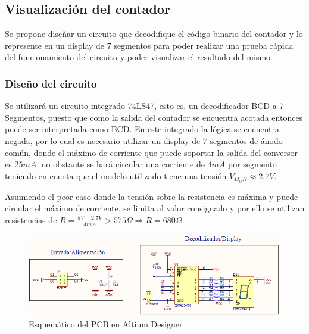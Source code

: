 \subsection{Visualizaci\'on del contador}
Se propone dise\~nar un circuito que decodifique el c\'odigo binario del contador y lo represente en un display
de 7 segmentos para poder realizar una prueba r\'apida del funcionamiento del circuito y poder visualizar el resultado del mismo.

\subsubsection{Dise\~no del circuito}
Se utilizar\'a un circuito integrado 74LS47, esto es, un decodificador BCD a 7 Segmentos, puesto que como la salida del contador se encuentra acotada
entonces puede ser interpretada como BCD. En este integrado la l\'ogica se encuentra negada, por lo cual es necesario utilizar un display de 7 segmentos de \'anodo com\'un,
donde el m\'aximo de corriente que puede soportar la salida del conversor es $25mA$, no obstante se har\'a circular una corriente de $4mA$ por segmento teniendo en cuenta que el modelo utilizado tiene una
tensi\'on $V_{D_ON} \approx 2.7V$.

Asumiendo el peor caso donde la tensi\'on sobre la resistencia es m\'axima y puede circular el m\'aximo de corriente, se limita al valor consignado y por ello se utilizan resistencias
de $R = \frac{5V - 2.7V}{4mA} > 575 \Omega \Rightarrow R = 680 \Omega$.

\begin{figure}[H]
    \centering
        \includegraphics[scale=0.7]{../EJ7/Recursos/esquematico_visualizacion.PNG}
    \caption{Esquem\'atico del PCB en Altium Designer}
    \label{fig:esquematico_visualizacion}
\end{figure}


